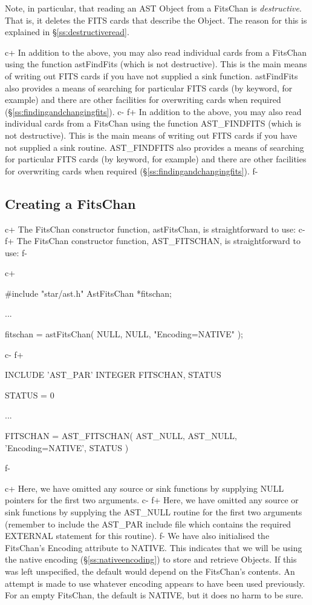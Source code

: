 \documentclass[twoside,11pt]{starlink}
\providecommand{\secref}[1]{\S\ref{#1}}
\begin{document}
{Note, in particular, that reading an AST Object from a FitsChan is
\emph{destructive}. That is, it deletes the FITS cards that describe the
Object. The reason for this is explained in
\secref{ss:destructiveread}.

c+
In addition to the above, you may also read individual cards from a
FitsChan using the function astFindFits (which is not
destructive). This is the main means of writing out FITS cards if you
have not supplied a sink function.  astFindFits also provides a means
of searching for particular FITS cards (by keyword, for example) and
there are other facilities for overwriting cards when required
(\secref{ss:findingandchangingfits}).
c-
f+
In addition to the above, you may also read individual cards from a
FitsChan using the function AST\_FINDFITS (which is not
destructive). This is the main means of writing out FITS cards if you
have not supplied a sink routine.  AST\_FINDFITS also provides a means
of searching for particular FITS cards (by keyword, for example) and
there are other facilities for overwriting cards when required
(\secref{ss:findingandchangingfits}).
f-

\subsection{\label{ss:creatingafitschan}Creating a FitsChan}

c+
The FitsChan constructor function, astFitsChan, is straightforward to
use:
c-
f+
The FitsChan constructor function, AST\_FITSCHAN, is straightforward
to use:
f-

c+
\small
\begin{terminalv}
#include "star/ast.h"
AstFitsChan *fitschan;

...

fitschan = astFitsChan( NULL, NULL, "Encoding=NATIVE" );
\end{terminalv}
\normalsize
c-
f+
\small
\begin{terminalv}
      INCLUDE 'AST_PAR'
      INTEGER FITSCHAN, STATUS

      STATUS = 0

      ...

      FITSCHAN = AST_FITSCHAN( AST_NULL, AST_NULL, 'Encoding=NATIVE', STATUS )
\end{terminalv}
\normalsize
f-

c+
Here, we have omitted any source or sink functions by supplying NULL
pointers for the first two arguments.
c-
f+
Here, we have omitted any source or sink functions by supplying the
AST\_NULL routine for the first two arguments (remember to include the
AST\_PAR include file which contains the required EXTERNAL statement
for this routine).
f-
We have also initialised the FitsChan's Encoding attribute to
NATIVE. This indicates that we will be using the native encoding
(\secref{ss:nativeencoding}) to store and retrieve Objects. If this
was left unspecified, the default would depend on the FitsChan's
contents. An attempt is made to use whatever encoding appears to have
been used previously. For an empty FitsChan, the default is NATIVE,
but it does no harm to be sure.

}
\end{document}
